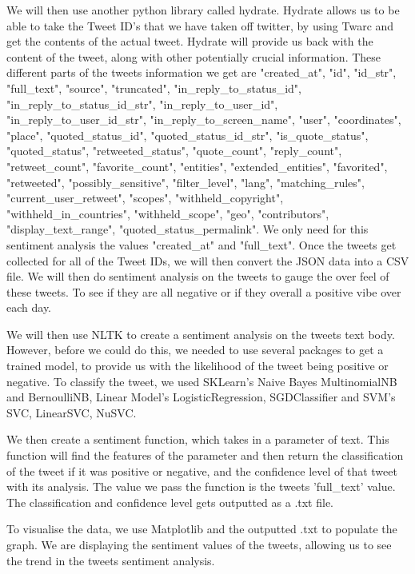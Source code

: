 \documentclass[a4paper,10pt]{article}
\begin{document}
We will then use another python library called hydrate. Hydrate allows us to be able to take the Tweet ID's that we have taken off twitter, by using Twarc and get the contents of the actual tweet. Hydrate will provide us back with the content of the tweet, along with other potentially crucial information. These different parts of the tweets information we get are "created\_at", "id", "id\_str", "full\_text", "source", "truncated", "in\_reply\_to\_status\_id", "in\_reply\_to\_status\_id\_str", "in\_reply\_to\_user\_id", "in\_reply\_to\_user\_id\_str", "in\_reply\_to\_screen\_name", "user", "coordinates", "place", "quoted\_status\_id", "quoted\_status\_id\_str", "is\_quote\_status", "quoted\_status", "retweeted\_status", "quote\_count", "reply\_count", "retweet\_count", "favorite\_count", "entities", "extended\_entities", "favorited", "retweeted", "possibly\_sensitive", "filter\_level", "lang", "matching\_rules", "current\_user\_retweet", "scopes", "withheld\_copyright", "withheld\_in\_countries", "withheld\_scope", "geo", "contributors", "display\_text\_range", "quoted\_status\_permalink". We only need for this sentiment analysis the values "created\_at" and "full\_text". Once the tweets get collected for all of the Tweet IDs, we will then convert the JSON data into a CSV file. We will then do sentiment analysis on the tweets to gauge the over feel of these tweets. To see if they are all negative or if they overall a positive vibe over each day.

We will then use NLTK to create a sentiment analysis on the tweets text body. However, before we could do this, we needed to use several packages to get a trained model, to provide us with the likelihood of the tweet being positive or negative. To classify the tweet, we used SKLearn's Naive Bayes MultinomialNB and BernoulliNB, Linear Model's LogisticRegression, SGDClassifier and SVM's SVC, LinearSVC, NuSVC.

We then create a sentiment function, which takes in a parameter of text. This function will find the features of the parameter and then return the classification of the tweet if it was positive or negative, and the confidence level of that tweet with its analysis. The value we pass the function is the tweets 'full\_text' value. The classification and confidence level gets outputted as a .txt file.


To visualise the data, we use Matplotlib and the outputted .txt to populate the graph. We are displaying the sentiment values of the tweets, allowing us to see the trend in the tweets sentiment analysis. 
\end{document}
